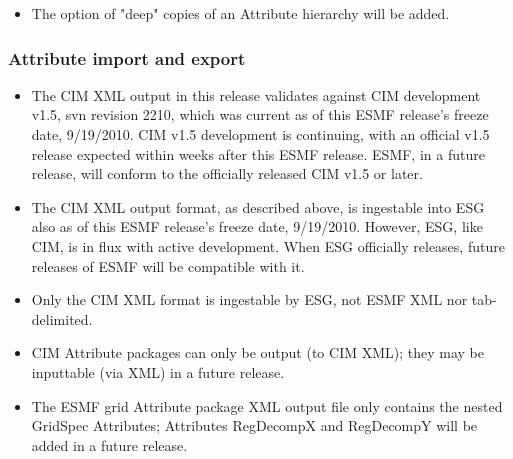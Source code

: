 \begin{itemize}
\item The option of "deep" copies of an Attribute hierarchy will be added.
\end{itemize}


\subsubsection{Attribute import and export}
\begin{itemize}
\item The CIM XML output in this release validates against CIM development v1.5, svn revision 2210, which was current as of this ESMF release's freeze date, 9/19/2010.  CIM v1.5 development is continuing, with an official v1.5 release expected within weeks after this ESMF release.  ESMF, in a future release, will conform to the officially released CIM v1.5 or later.
\item The CIM XML output format, as described above, is ingestable into ESG also as of this ESMF release's freeze date, 9/19/2010. However, ESG, like CIM, is in flux with active development.  When ESG officially releases, future releases of ESMF will be compatible with it.
\item Only the CIM XML format is ingestable by ESG, not ESMF XML nor tab-delimited.
\item CIM Attribute packages can only be output (to CIM XML); they may be inputtable (via XML) in a future release.
\item The ESMF grid Attribute package XML output file only contains the nested GridSpec Attributes; Attributes RegDecompX and RegDecompY will be added in a future release. 
\end{itemize}

